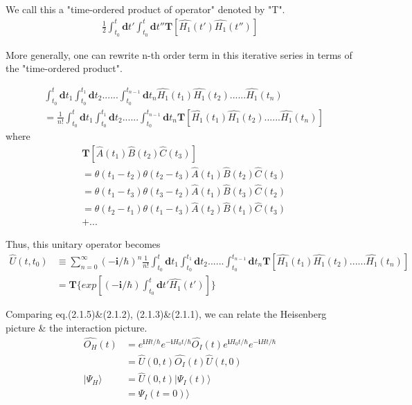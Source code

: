 ﻿\documentclass[twoside]{book}
\numberwithin{equation}{section}
\begin{document}
 We call this a "time-ordered product of operator" denoted by "T".
\begin{align}
\frac{1}{2}\int_{t_0}^{t}\bm{d}t'\int_{t_0}^{t}\bm{d}t''\bm{T}[\hat{H_1}(t')\hat{H_1}(t'')]\nonumber
\end{align}

 More generally, one can rewrite n-th order term in this iterative series in terms of the "time-ordered product".

\begin{align}\label{2-1-7}
&\int_{t_0}^{t}\bm{d}t_1\int_{t_0}^{t_1}\bm{d}t_2......\int_{t_0}^{t_{n-1}}\bm{d}t_n \hat{H_1}(t_1)\hat{H_1}(t_2)......\hat{H_1}(t_n)\nonumber \\
&= \frac{1}{n!}\int_{t_0}^{t}\bm{d}t_1\int_{t_0}^{t_1}\bm{d}t_2......\int_{t_0}^{t_{n-1}}\bm{d}t_n\bm{T}[\hat{H_1}(t_1)\hat{H_1}(t_2)......\hat{H_1}(t_n)]
\end{align}
where
\begin{align}
&\bm{T}[\hat{A}(t_1)\hat{B}(t_2)\hat{C}(t_3)] \nonumber \\
&=\theta(t_1-t_2)\theta(t_2-t_3)\hat{A}(t_1)\hat{B}(t_2)\hat{C}(t_3) \nonumber \\
&=\theta(t_1-t_3)\theta(t_3-t_2)\hat{A}(t_1)\hat{B}(t_3)\hat{C}(t_2) \nonumber \\
&=\theta(t_2-t_1)\theta(t_1-t_3)\hat{A}(t_2)\hat{B}(t_1)\hat{C}(t_3) \nonumber \\
&+ ... \nonumber
\end{align}

 Thus, this unitary operator becomes
\begin{align}
\hat{U}(t,t_0)&\equiv\sum_{n=0}^{\infty}(-\bm{i}/\hbar)^n\frac{1}{n!}\int_{t_0}^{t}\bm{d}t_1\int_{t_0}^{t_1}\bm{d}t_2......\int_{t_0}^{t_{n-1}}\bm{d}t_n\bm{T}[\hat{H_1}(t_1)\hat{H_1}(t_2)......\hat{H_1}(t_n)] \nonumber \\
&=\bm{T} \{exp[(-\bm{i}/\hbar)\int_{t_0}^{t}\bm{d}t'\hat{H_1}(t')]\}
\end{align}

 	Comparing eq.(2.1.5)\&(2.1.2), (2.1.3)\&(2.1.1), we can relate the Heisenberg picture \& the interaction picture.
\begin{align}
\hat{O_H}(t)&=e^{\bm{i}Ht/\hbar}e^{-\bm{i}H_0t/\hbar}\hat{O_I}(t)e^{\bm{i}H_0t/\hbar}e^{-\bm{i}Ht/\hbar} \nonumber \\
&=\hat{U}(0,t)\hat{O_I}(t)\hat{U}(t,0) \nonumber \\
|\Psi_H\rangle&=\hat{U}(0,t)|\Psi_I(t)\rangle \nonumber \\
&=\Psi_I(t=0)\rangle
\end{align}
\end{document}
